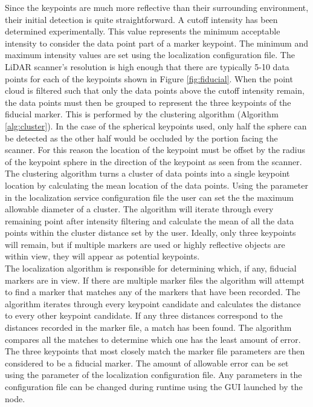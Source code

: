 Since the keypoints are much more reflective than their surrounding environment, their initial detection is quite straightforward. A cutoff intensity has been determined experimentally. This value represents the minimum acceptable intensity to consider the data point part of a marker keypoint. The minimum and maximum intensity values are set using the localization configuration file. The LiDAR scanner's resolution is high enough that there are typically 5-10 data points for each of the keypoints shown in Figure \ref{fig:fiducial}. When the point cloud is filtered such that only the data points above the cutoff intensity remain, the data points must then be grouped to represent the three keypoints of the fiducial marker. This is performed by the clustering algorithm (Algorithm \ref{alg:cluster}). In the case of the spherical keypoints used, only half the sphere can be detected as the other half would be occluded by the portion facing the scanner. For this reason the location of the keypoint must be offset by the radius of the keypoint sphere in the direction of the keypoint as seen from the scanner.\\

The clustering algorithm turns a cluster of data points into a single keypoint location by calculating the mean location of the data points. Using the  parameter in the localization service configuration file the user can set the the maximum allowable diameter of a cluster. The algorithm will iterate through every remaining point after intensity filtering and calculate the mean of all the data points within the cluster distance set by the user. Ideally, only three keypoints will remain, but if multiple markers are used or highly reflective objects are within view, they will appear as potential keypoints.\\

The localization algorithm is responsible for determining which, if any, fiducial markers are in view. If there are multiple marker files the algorithm will attempt to find a marker that matches any of the markers that have been recorded. The algorithm iterates through every keypoint candidate and calculates the distance to every other keypoint candidate. If any three distances correspond to the distances recorded in the marker file, a match has been found. The algorithm compares all the matches to determine which one has the least amount of error. The three keypoints that most closely match the marker file parameters are then considered to be a fiducial marker. The amount of allowable error can be set using the  parameter of the localization configuration file. Any parameters in the configuration file can be changed during runtime using the GUI launched by the  node.\\

